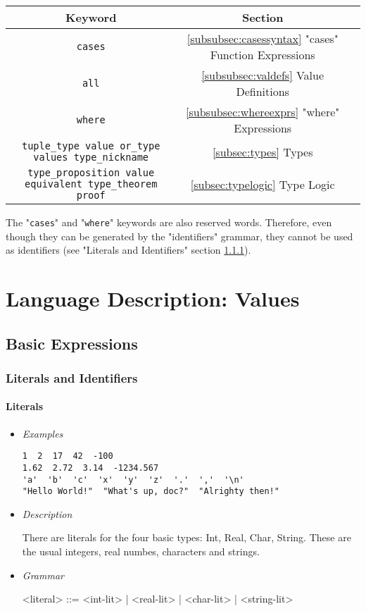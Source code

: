 \documentclass{article}
\begin{document}
\begin{center}
\begin{tabular}{ |c|c|c| } 
\hline
Keyword & Section \\ 
\hline
\hline
\texttt{cases} & \ref{subsubsec:casessyntax} "cases" Function Expressions \\
\hline
\texttt{all} & \ref{subsubsec:valdefs} Value Definitions \\
\hline
\texttt{where} & \ref{subsubsec:whereexprs} "where" Expressions \\
\hline
\texttt{tuple_type value or_type values type_nickname} &
\ref{subsec:types} Types \\
\hline
\texttt{type_proposition value equivalent type_theorem proof} &
{\ref{subsec:typelogic} Type Logic} \\
\hline
\end{tabular}
\end{center}
The "\texttt{cases}" and "\texttt{where}" keywords are also
reserved words. Therefore, even though they can be generated by the
"identifiers" grammar, they cannot be used as identifiers (see "Literals and
Identifiers" section \ref{subsubsec:litsandidents}).

\newpage
\section{Language Description: Values}

\subsection{Basic Expressions}

\subsubsection{Literals and Identifiers}
\label{subsubsec:litsandidents}

\paragraph{Literals}
\begin{itemize}

\item \textit{Examples}
\begin{verbatim}
1  2  17  42  -100
1.62  2.72  3.14  -1234.567
'a'  'b'  'c'  'x'  'y'  'z'  '.'  ','  '\n'
"Hello World!"  "What's up, doc?"  "Alrighty then!"
\end{verbatim}

\item \textit{Description}

There are literals for the four basic types: Int, Real, Char, String. These are the 
usual integers, real numbes, characters and strings.

\item \textit{Grammar}
\begin{grammar}
<literal> ::= <int-lit> | <real-lit> | <char-lit> | <string-lit>
\end{grammar}

\end{itemize}
\end{document}

